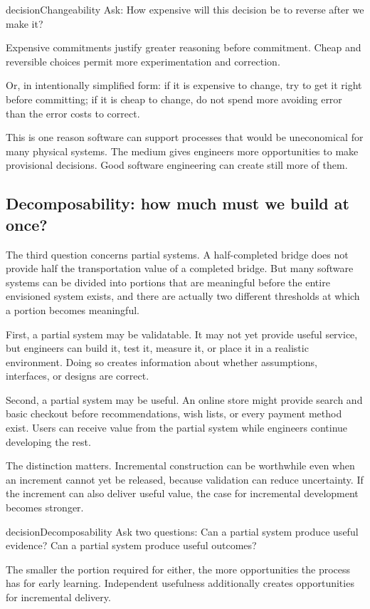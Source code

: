 \begin{bookbox}{decision}{Changeability} %
Ask: How expensive will this decision be to reverse after we make it?

Expensive commitments justify greater reasoning before commitment. Cheap and reversible choices permit
more experimentation and correction.
\end{bookbox}

Or, in intentionally simplified form: if it is expensive to change, try to get it right before
committing; if it is cheap to change, do not spend more avoiding error than the error costs to correct.

This is one reason software can support processes that would be uneconomical for many physical systems.
The medium gives engineers more opportunities to make provisional decisions. Good software engineering
can create still more of them.

\subsection{Decomposability: how much must we build at once?}\label{sec-decomposability}

The third question concerns partial systems. A half-completed bridge does not provide half the
transportation value of a completed bridge. But many software systems can be divided into portions
that are meaningful before the entire envisioned system exists, and there are actually two
different thresholds at which a portion becomes meaningful.

First, a partial system may be validatable. It may not yet provide useful service, but engineers can
build it, test it, measure it, or place it in a realistic environment. Doing so creates information about
whether assumptions, interfaces, or designs are correct.

Second, a partial system may be useful. An online store might provide search and basic checkout before
recommendations, wish lists, or every payment method exist. Users can receive value from the partial
system while engineers continue developing the rest.

The distinction matters. Incremental construction can be worthwhile even when an increment cannot yet be
released, because validation can reduce uncertainty. If the increment can also deliver useful value, the
case for incremental development becomes stronger.

\begin{bookbox}{decision}{Decomposability} %
Ask two questions: Can a partial system produce useful evidence? Can a partial system produce useful
outcomes?

The smaller the portion required for either, the more opportunities the process has for early learning.
Independent usefulness additionally creates opportunities for incremental delivery.
\end{bookbox}

